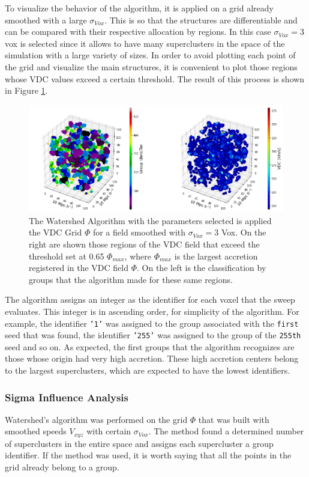 To visualize the behavior of the algorithm, it is applied on a grid already smoothed with a large $\sigma_{Vox}$. This is so that the structures are differentiable and can be compared with their respective allocation by regions. In this case $\sigma_{Vox} = 3$ vox is selected since it allows to have many superclusters in the space of the simulation with a large variety of sizes. In order to avoid plotting each point of the grid and visualize the main structures, it is convenient to plot those regions whose VDC values exceed a certain threshold. The result of this process is shown in Figure \ref{fig:3STRUCTURES}.
\begin{figure}[!h]
    \centering
    \includegraphics[width=450pt]{N65SegmentationSigmas137.png}
    \caption{The Watershed Algorithm with the parameters selected is applied the VDC Grid $\Phi$ for a field smoothed with $\sigma_{Vox} = 3$ Vox. On the right are shown those regions of the VDC field that exceed the threshold set at 0.65 $\Phi_{max}$, where $\Phi_{max}$ is the largest accretion registered in the VDC field $\Phi$. On the left is the classification by groups that the algorithm made for these same regions.}
    \label{fig:3STRUCTURES}
\end{figure}

The algorithm assigns an integer as the identifier for each voxel that the sweep evaluates. This integer is in ascending order, for simplicity of the algorithm. For example, the identifier \texttt{'1'} was assigned to the group associated with the \texttt{first} seed that was found, the identifier \texttt{'255'} was assigned to the group of the \texttt{255th} seed and so on. As expected, the first groups that the algorithm recognizes are those whose origin had very high accretion. These high accretion centers belong to the largest superclusters, which are expected to have the lowest identifiers.

\subsubsection{Sigma Influence Analysis}
\label{sec:Sigmainfluence}
Watershed's algorithm was performed on the grid $\Phi$ that was built with smoothed speeds $V_{xyz}$ with certain  $\sigma_{Vox}$. The method found a determined number of superclusters in the entire space and assigns each supercluster a group identifier. If the method was used, it is worth saying that all the points in the grid already belong to a group.

